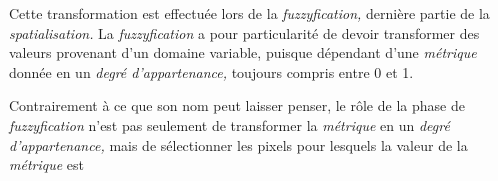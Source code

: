 Cette transformation est effectuée lors de la \emph{fuzzyfication,} dernière partie de la \emph{spatialisation.}
%
La \emph{fuzzyfication} a pour particularité de devoir transformer des valeurs provenant d'un domaine variable, puisque dépendant d'une \emph{métrique} donnée en un \emph{degré d'appartenance,} toujours compris entre 0 et 1.

Contrairement à ce que son nom peut laisser penser, le rôle de la phase de \emph{fuzzyfication} n'est pas seulement de transformer la \emph{métrique} en un \emph{degré d'appartenance,} mais de sélectionner les pixels pour lesquels la valeur de la \emph{métrique} est




